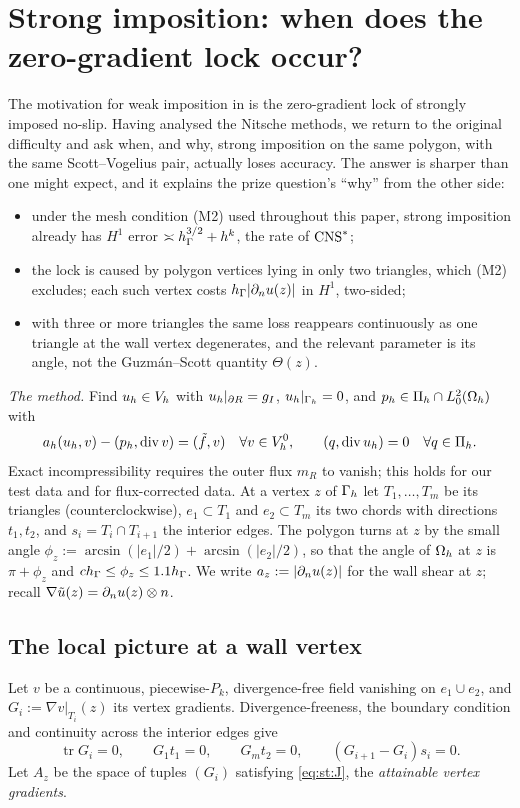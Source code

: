 \section{Strong imposition: when does the zero-gradient lock occur?}\label{sec:strong}

The motivation for weak imposition in \cite{ScottPrize,GjerdeScott2024} is the zero-gradient lock of strongly imposed no-slip. Having analysed the Nitsche methods, we return to the original difficulty and ask when, and why, strong imposition on the same polygon, with the same Scott--Vogelius pair, actually loses accuracy. The answer is sharper than one might expect, and it explains the prize question's ``why'' from the other side:
\begin{itemize}
\item under the mesh condition (M2) used throughout this paper, strong imposition already has $H^1$ error $\asymp h_\Gamma^{3/2}+h^k$, the rate of $\mathrm{CNS}^\ast$;
\item the lock is caused by polygon vertices lying in only two triangles, which (M2) excludes; each such vertex costs $h_\Gamma|\partial_n u(z)|$ in $H^1$, two-sided;
\item with three or more triangles the same loss reappears continuously as one triangle at the wall vertex degenerates, and the relevant parameter is its angle, not the Guzm\'an--Scott quantity $\Theta(z)$.
\end{itemize}

\emph{The method.} Find $u_h\in V_h$ with $u_h|_{\partial R}=g_I$, $u_h|_{\Gamma_h}=0$, and $p_h\in\Pi_h\cap L^2_0(\Omega_h)$ with
\[
a_h(u_h,v)-(p_h,\operatorname{div} v)=(\tilde f,v)\quad\forall v\in V_h^0,\qquad (q,\operatorname{div} u_h)=0\quad\forall q\in\Pi_h .
\]
Exact incompressibility requires the outer flux $m_R$ to vanish; this holds for our test data and for flux-corrected data. At a vertex $z$ of $\Gamma_h$ let $T_1,\dots,T_m$ be its triangles (counterclockwise), $e_1\subset T_1$ and $e_2\subset T_m$ its two chords with directions $t_1,t_2$, and $s_i=T_i\cap T_{i+1}$ the interior edges. The polygon turns at $z$ by the small angle $\phi_z:=\arcsin(|e_1|/2)+\arcsin(|e_2|/2)$, so that the angle of $\Omega_h$ at $z$ is $\pi+\phi_z$ and $ch_\Gamma\le\phi_z\le1.1h_\Gamma$. We write $a_z:=|\partial_n u(z)|$ for the wall shear at $z$; recall $\nabla\tilde u(z)=\partial_n u(z)\otimes n$.

\subsection{The local picture at a wall vertex}
Let $v$ be a continuous, piecewise-$P_k$, divergence-free field vanishing on $e_1\cup e_2$, and $G_i:=\nabla v|_{T_i}(z)$ its vertex gradients. Divergence-freeness, the boundary condition and continuity across the interior edges give
\begin{equation}\label{eq:st:J}
\operatorname{tr}G_i=0,\qquad G_1t_1=0,\qquad G_mt_2=0,\qquad (G_{i+1}-G_i)s_i=0 .
\end{equation}
Let $A_z$ be the space of tuples $(G_i)$ satisfying \eqref{eq:st:J}, the \emph{attainable vertex gradients}.

